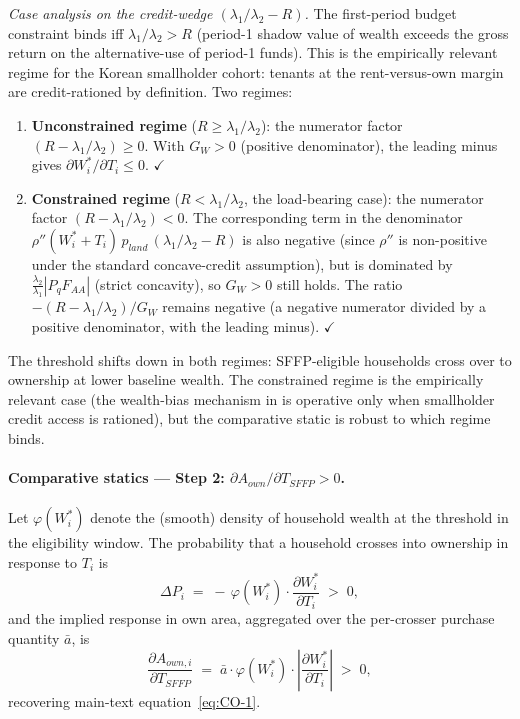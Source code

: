 \documentclass[11pt, a4paper]{article}
\begin{document}
\textit{Case analysis on the credit-wedge $(\lambda_1/\lambda_2 - R)$.}
The first-period budget constraint binds iff $\lambda_1/\lambda_2 > R$
(period-1 shadow value of wealth exceeds the gross return on the
alternative-use of period-1 funds). This is the empirically relevant
regime for the Korean smallholder cohort: tenants at the rent-versus-own
margin are credit-rationed by definition. Two regimes:
\begin{enumerate}
\item \textbf{Unconstrained regime} ($R \ge \lambda_1/\lambda_2$): the
  numerator factor $(R - \lambda_1/\lambda_2) \ge 0$. With $G_W > 0$
  (positive denominator), the leading minus gives
  $\partial W_i^*/\partial T_i \le 0$. $\checkmark$
\item \textbf{Constrained regime} ($R < \lambda_1/\lambda_2$, the
  load-bearing case): the numerator factor $(R - \lambda_1/\lambda_2) < 0$.
  The corresponding term in the denominator
  $\rho''(W_i^* + T_i)\,p_{land}\,(\lambda_1/\lambda_2 - R)$ is also
  negative (since $\rho''$ is non-positive under the standard concave-credit
  assumption), but is dominated by $\tfrac{\lambda_2}{\lambda_1}|P_q F_{AA}|$
  (strict concavity), so $G_W > 0$ still holds. The ratio
  $-(R - \lambda_1/\lambda_2)/G_W$ remains negative (a negative numerator
  divided by a positive denominator, with the leading minus). $\checkmark$
\end{enumerate}
The threshold shifts down in both regimes: SFFP-eligible households cross
over to ownership at lower baseline wealth. The constrained regime is the
empirically relevant case (the wealth-bias mechanism in
\citet{CarterOlinto2003_liquidity} is operative only when smallholder credit
access is rationed), but the comparative static is robust to which regime
binds.

\paragraph{Comparative statics --- Step 2: $\partial A_{own}/\partial T_{SFFP} > 0$.}
Let $\varphi(W_i^*)$ denote the (smooth) density of household wealth at the
threshold in the eligibility window. The probability that a household crosses
into ownership in response to $T_i$ is
\begin{equation}
\Delta P_i \;=\; -\,\varphi(W_i^*)\cdot \frac{\partial W_i^*}{\partial T_i} \;>\; 0,
\label{eq:appB-step2-prob}
\end{equation}
and the implied response in own area, aggregated over the per-crosser purchase
quantity $\bar a$, is
\begin{equation}
\boxed{\frac{\partial A_{own,i}}{\partial T_{SFFP}} \;=\; \bar a \cdot \varphi(W_i^*) \cdot \left|\frac{\partial W_i^*}{\partial T_i}\right| \;>\; 0,}
\label{eq:appB-step2}
\end{equation}
recovering main-text equation~\ref{eq:CO-1}.
\end{document}
